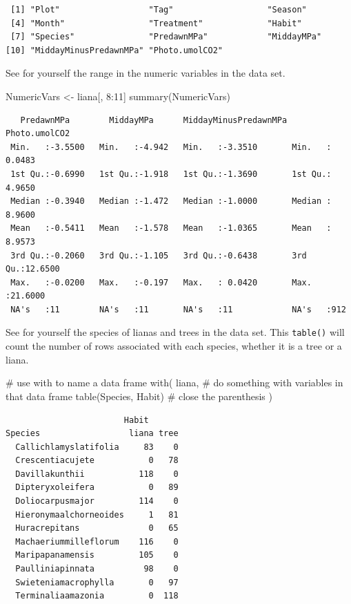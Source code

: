 \documentclass[
  letterpaper,
  DIV=11,
  numbers=noendperiod]{scrreprt}
\newenvironment{Shaded}{\begin{snugshade}}{\end{snugshade}}
\newcommand{\CommentTok}[1]{\textcolor[rgb]{0.37,0.37,0.37}{#1}}
\newcommand{\DecValTok}[1]{\textcolor[rgb]{0.68,0.00,0.00}{#1}}
\newcommand{\FunctionTok}[1]{\textcolor[rgb]{0.28,0.35,0.67}{#1}}
\newcommand{\NormalTok}[1]{\textcolor[rgb]{0.00,0.23,0.31}{#1}}
\newcommand{\OtherTok}[1]{\textcolor[rgb]{0.00,0.23,0.31}{#1}}
\newcommand{\SpecialCharTok}[1]{\textcolor[rgb]{0.37,0.37,0.37}{#1}}
\begin{document}
\begin{verbatim}
 [1] "Plot"                  "Tag"                   "Season"               
 [4] "Month"                 "Treatment"             "Habit"                
 [7] "Species"               "PredawnMPa"            "MiddayMPa"            
[10] "MiddayMinusPredawnMPa" "Photo.umolCO2"        
\end{verbatim}

See for yourself the range in the numeric variables in the data set.

\begin{Shaded}
\begin{Highlighting}[]
\NormalTok{NumericVars }\OtherTok{\textless{}{-}}\NormalTok{ liana[, }\DecValTok{8}\SpecialCharTok{:}\DecValTok{11}\NormalTok{]}
\FunctionTok{summary}\NormalTok{(NumericVars)}
\end{Highlighting}
\end{Shaded}

\begin{verbatim}
   PredawnMPa        MiddayMPa      MiddayMinusPredawnMPa Photo.umolCO2    
 Min.   :-3.5500   Min.   :-4.942   Min.   :-3.3510       Min.   : 0.0483  
 1st Qu.:-0.6990   1st Qu.:-1.918   1st Qu.:-1.3690       1st Qu.: 4.9650  
 Median :-0.3940   Median :-1.472   Median :-1.0000       Median : 8.9600  
 Mean   :-0.5411   Mean   :-1.578   Mean   :-1.0365       Mean   : 8.9573  
 3rd Qu.:-0.2060   3rd Qu.:-1.105   3rd Qu.:-0.6438       3rd Qu.:12.6500  
 Max.   :-0.0200   Max.   :-0.197   Max.   : 0.0420       Max.   :21.6000  
 NA's   :11        NA's   :11       NA's   :11            NA's   :912      
\end{verbatim}

See for yourself the species of lianas and trees in the data set. This
\texttt{table()} will count the number of rows associated with each
species, whether it is a tree or a liana.

\begin{Shaded}
\begin{Highlighting}[]
\CommentTok{\# use \textquotesingle{}with\textquotesingle{} to name a data frame}
\FunctionTok{with}\NormalTok{( liana,}
      \CommentTok{\# do something with variables in that data frame}
      \FunctionTok{table}\NormalTok{(Species, Habit) }
      \CommentTok{\# close the parenthesis}
\NormalTok{      )}
\end{Highlighting}
\end{Shaded}

\begin{verbatim}
                        Habit
Species                  liana tree
  Callichlamyslatifolia     83    0
  Crescentiacujete           0   78
  Davillakunthii           118    0
  Dipteryxoleifera           0   89
  Doliocarpusmajor         114    0
  Hieronymaalchorneoides     1   81
  Huracrepitans              0   65
  Machaeriummilleflorum    116    0
  Maripapanamensis         105    0
  Paulliniapinnata          98    0
  Swieteniamacrophylla       0   97
  Terminaliaamazonia         0  118
\end{verbatim}
\end{document}
